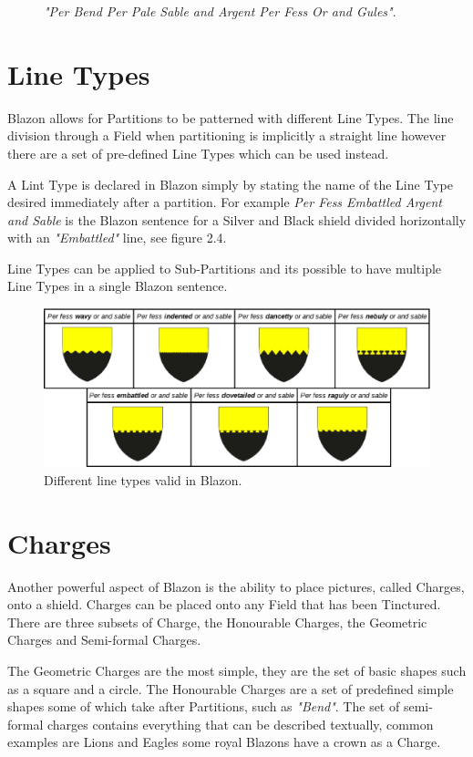 \begin{figure}[H]
\hfill
\caption{\emph{"Per Bend Per Pale Sable and Argent Per Fess Or and Gules"}.}
\end{figure}

\section{Line Types}

Blazon allows for Partitions to be patterned with different Line Types.  The line division through a Field when partitioning is implicitly a straight line however there are a set of pre-defined Line Types which can be used instead.  

A Lint Type is declared in Blazon simply by stating the name of the Line Type desired immediately after a partition. For example \emph{Per Fess Embattled Argent and Sable} is the Blazon sentence for a Silver and Black shield divided horizontally with an \emph{"Embattled"} line, see figure 2.4.  

Line Types can be applied to Sub-Partitions and its possible to have multiple Line Types in a single Blazon sentence. 

\begin{figure}[H]
  \centering
    \includegraphics[width=\textwidth]{blazon/images/linetypes.eps}
  \caption{Different line types valid in Blazon.\cite{linetypes}}
  
\end{figure}


\section{Charges}
Another powerful aspect of Blazon is the ability to place pictures, called Charges, onto a shield.  Charges can be placed onto any Field that has been Tinctured.  There are three subsets of Charge, the Honourable Charges, the Geometric Charges and Semi-formal Charges.

The Geometric Charges are the most simple, they are the set of basic shapes such as a square and a circle.  The Honourable Charges are a set of predefined simple shapes some of which take after Partitions, such as \emph{"Bend"}.  The set of semi-formal charges contains everything that can be described textually, common examples are Lions and Eagles some royal Blazons have a crown as a Charge. 



